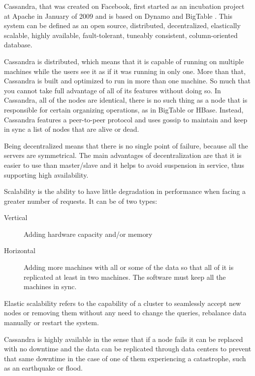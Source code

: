 Cassandra\cite{will10}, that was created on Facebook, first started as an incubation project at Apache in January of 2009 and is based on Dynamo \cite{Hastorun2007} and BigTable \cite{Chang2008}. This system can be defined as an open source, distributed, decentralized, elastically scalable, highly available, fault-tolerant, tuneably consistent, column-oriented database\cite{hewitt2010cassandra}. 

Cassandra is distributed, which means that it is capable of running on multiple machines while the users see it as if it was running in only one. More than that, Cassandra is built and optimized to run in more than one machine. So much that you cannot take full advantage of all of its features without doing so. In Cassandra, all of the nodes are identical, there is no such thing as a node that is responsible for certain organizing operations, as in BigTable or HBase. Instead, Cassandra features a peer-to-peer protocol and uses gossip to maintain and keep in sync a list of nodes that are alive or dead. 

Being decentralized means that there is no single point of failure, because all the servers are symmetrical. The main advantages of decentralization are that it is easier to use than master/slave and it helps to avoid suspension in service, thus supporting high availability.

Scalability is the ability to have little degradation in performance when facing a greater number of requests. It can be of two types:

\begin{description}
	\item[Vertical] Adding hardware capacity and/or memory
	\item[Horizontal] Adding more machines with all or some of the data so that all of it is replicated at least in two machines. The software must keep all the machines in sync. 
\end{description}

Elastic scalability refers to the capability of a cluster to seamlessly accept new nodes or removing them without any need to change the queries, rebalance data manually or restart the system.

Cassandra is highly available in the sense that if a node fails it can be replaced with no downtime and the data can be replicated through data centers to prevent that same downtime in the case of one of them experiencing a catastrophe, such as an earthquake or flood. 

